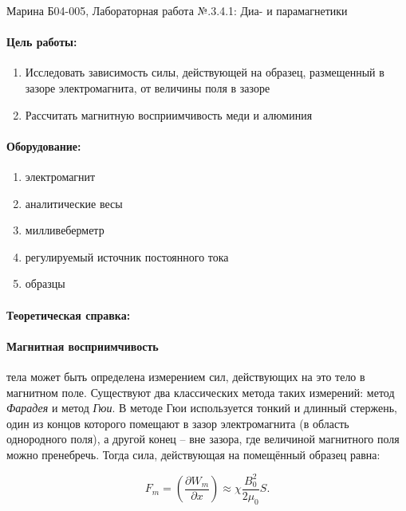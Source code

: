 \documentclass[a4paper,12pt]{article}
\author{Бичина Марина 
группа Б04-005 1 курса ФЭФМ}
\title{}
\date{}
\begin{document}

\begin{center}
\begin{Large}
{ Марина Б04-005, Лабораторная работа №.3.4.1:
Диа- и парамагнетики}
\end{Large}
\end{center}
\paragraph{Цель работы:} 
\begin{enumerate}
\itemsep0em
\item Исследовать зависимость силы, действующей на образец, размещенный в зазоре электромагнита, от величины поля в зазоре 
\item Рассчитать магнитную восприимчивость меди и алюминия
\end{enumerate}
\paragraph{Оборудование:}
\begin{enumerate}
\itemsep0em
\item электромагнит
\item аналитические весы
\item милливеберметр
\item регулируемый источник постоянного тока
\item образцы
\end{enumerate}


\paragraph{Теоретическая справка:}
\paragraph{Магнитная восприимчивость} тела может быть определена измерением сил, действующих на это тело в магнитном поле. Существуют два классических метода таких измерений: метод \textit{Фарадея }и метод \textit{Гюи}. В методе Гюи используется тонкий и длинный стержень, один из концов которого помещают в зазор электромагнита (в область однородного поля), а другой конец -- вне зазора, где величиной магнитного поля можно пренебречь. Тогда сила, действующая на помещённый образец равна:

\[
F_m = \left( \frac{\partial W_m}{\partial x} \right) \approx \chi \frac{B_0^2}{2 \mu_0} S.
\]
\end{document}
